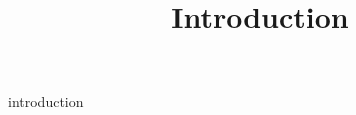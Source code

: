 \documentclass[10pt]{article}
\title{Introduction}
\date{}
\author{}
\begin{document}
\maketitle


{introduction}
% 

\end{document}
